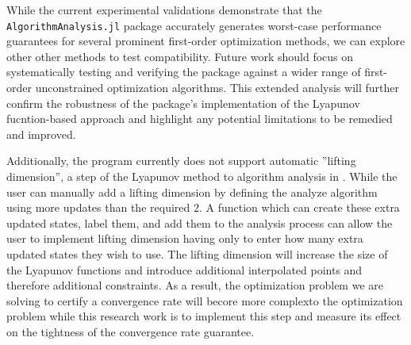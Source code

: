 While the current experimental validations demonstrate that the \texttt{AlgorithmAnalysis.jl} package accurately generates worst-case performance guarantees for several prominent first-order optimization methods, we can explore other other methods to test compatibility. Future work should focus on systematically testing and verifying the package against a wider range of first-order unconstrained optimization algorithms. This extended analysis will further confirm the robustness of the package's implementation of the Lyapunov fucntion-based approach and highlight any potential limitations to be remedied and improved.

Additionally, the program currently does not support automatic ''lifting dimension'', a step of the Lyapunov method to algorithm analysis in \cite{tutorial}. While the user can manually add a lifting dimension by defining the analyze algorithm using more updates than the required 2. A function which can create these extra updated states, label them, and add them to the analysis process can allow the user to implement lifting dimension having only to enter how many extra updated states they wish to use. The lifting dimension will increase the size of the Lyapunov functions and introduce additional interpolated points and therefore additional constraints. As a result, the optimization problem we are solving to certify a convergence rate will becore more complexto the optimization problem while this research work is to implement this step and measure its effect on the tightness of the convergence rate guarantee.

